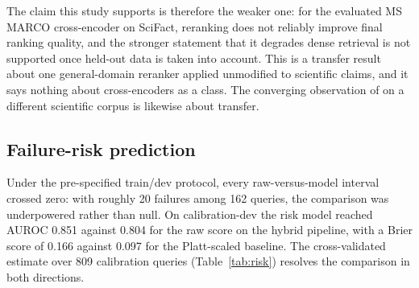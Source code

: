 \documentclass[11pt,a4paper]{article}
\begin{document}
The claim this study supports is therefore the weaker one: for the evaluated MS MARCO
cross-encoder on SciFact, reranking does not reliably improve final ranking quality, and the
stronger statement that it degrades dense retrieval is not supported once held-out data is
taken into account. This is a transfer result about one general-domain reranker applied
unmodified to scientific claims, and it says nothing about cross-encoders as a class. The
converging observation of \citet{apurba2026sciret} on a different scientific corpus is likewise
about transfer.

\subsection{Failure-risk prediction}
\label{sec:risk}

Under the pre-specified train/dev protocol, every raw-versus-model interval crossed zero: with
roughly 20 failures among 162 queries, the comparison was underpowered rather than null. On
calibration-dev the risk model reached AUROC 0.851 against 0.804 for the raw score on the
hybrid pipeline, with a Brier score of 0.166 against 0.097 for the Platt-scaled baseline. The
cross-validated estimate over 809 calibration queries (Table~\ref{tab:risk}) resolves the
comparison in both directions.
\end{document}
